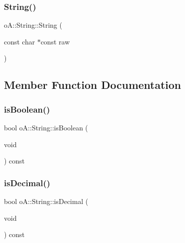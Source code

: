 \subsubsection{\texorpdfstring{String()}{String()}\hspace{0.1cm}{\footnotesize\ttfamily [7/7]}}
{\footnotesize\ttfamily o\+A\+::\+String\+::\+String (\begin{DoxyParamCaption}\item[{const char $\ast$const}]{raw }\end{DoxyParamCaption})\hspace{0.3cm}{\ttfamily [inline]}}



\subsection{Member Function Documentation}
\mbox{\label{classo_a_1_1_string_af57b0b992d2ce2995f3f843d7dd36e96}} 
\subsubsection{\texorpdfstring{is\+Boolean()}{isBoolean()}}
{\footnotesize\ttfamily bool o\+A\+::\+String\+::is\+Boolean (\begin{DoxyParamCaption}\item[{void}]{ }\end{DoxyParamCaption}) const\hspace{0.3cm}{\ttfamily [noexcept]}}

\mbox{\label{classo_a_1_1_string_a30effa3311ecb3f5f29e8d670709f436}} 
\subsubsection{\texorpdfstring{is\+Decimal()}{isDecimal()}}
{\footnotesize\ttfamily bool o\+A\+::\+String\+::is\+Decimal (\begin{DoxyParamCaption}\item[{void}]{ }\end{DoxyParamCaption}) const\hspace{0.3cm}{\ttfamily [noexcept]}}

